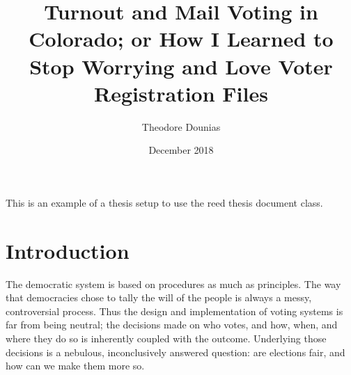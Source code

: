 \documentclass[12pt,twoside]{reedthesis}
\title{Turnout and Mail Voting in Colorado; or How I Learned to Stop Worrying
and Love Voter Registration Files}
\author{Theodore Dounias}
\date{December 2018}
\begin{document}
      \maketitle
  
  \frontmatter %
  \pagestyle{empty} %

  
      \begin{preface}
      This is an example of a thesis setup to use the reed thesis document
      class.
    \end{preface}
  
      \hypersetup{linkcolor=black}
    \setcounter{tocdepth}{3}
    \tableofcontents
  
      \listoftables
  
      \listoffigures
  
  
  
  \mainmatter %
  \pagestyle{fancyplain} %

  \chapter*{Introduction}\label{introduction}
  
  The democratic system is based on procedures as much as principles. The
  way that democracies chose to tally the will of the people is always a
  messy, controversial process. Thus the design and implementation of
  voting systems is far from being neutral; the decisions made on who
  votes, and how, when, and where they do so is inherently coupled with
  the outcome. Underlying those decisions is a nebulous, inconclusively
  answered question: are elections fair, and how can we make them more so.
  
\end{document}
